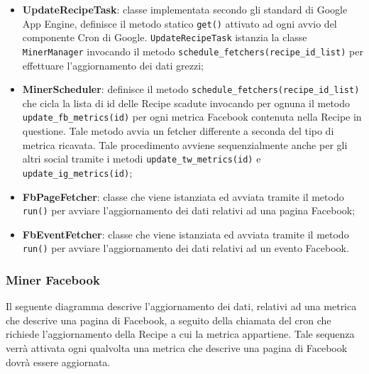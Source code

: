     \begin{itemize}
        \item \textbf{UpdateRecipeTask}: classe implementata secondo gli standard di Google App Engine, definisce il metodo statico \texttt{get()} attivato ad ogni avvio del componente Cron di Google. \texttt{UpdateRecipeTask} istanzia la classe \texttt{MinerManager} invocando il metodo \texttt{schedule\_fetchers(recipe\_id\_list)} per effettuare l'aggiornamento dei dati grezzi;
        \item \textbf{MinerScheduler}: definisce il metodo \texttt{schedule\_fetchers(recipe\_id\_list)} che cicla la lista di id delle Recipe scadute invocando per ognuna il metodo \texttt{update\_fb\_metrics(id)} per ogni metrica Facebook contenuta nella Recipe in questione. Tale metodo avvia un fetcher differente a seconda del tipo di metrica ricavata. Tale procedimento avviene sequenzialmente anche per gli altri social tramite i metodi \texttt{update\_tw\_metrics(id)} e \texttt{update\_ig\_metrics(id)};
        \item \textbf{FbPageFetcher}: classe che viene istanziata ed avviata tramite il metodo \texttt{run()} per avviare l'aggiornamento dei dati relativi ad una pagina Facebook;
        \item \textbf{FbEventFetcher}: classe che viene istanziata ed avviata tramite il metodo \texttt{run()} per avviare l'aggiornamento dei dati relativi ad un evento Facebook.
    \end{itemize}


	\subsubsection{Miner Facebook} %
    \label{ssub:miner_facebook}
    Il seguente diagramma descrive l'aggiornamento dei dati, relativi ad una metrica che descrive una pagina di Facebook, a seguito della chiamata del cron che richiede l'aggiornamento della Recipe a cui la metrica appartiene. Tale sequenza verrà attivata ogni qualvolta una metrica che descrive una pagina di Facebook dovrà essere aggiornata. \newline

